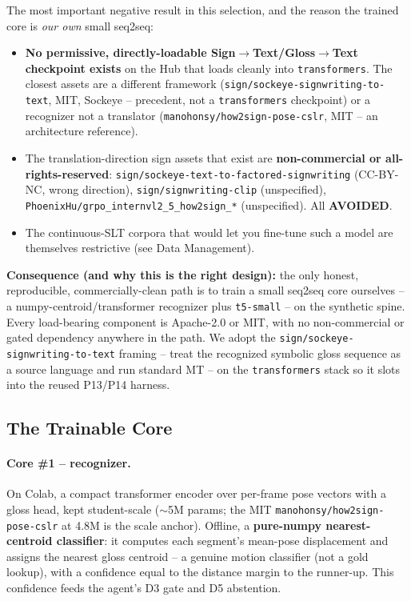 \documentclass[12pt,a4paper]{article}
\begin{document}
The most important negative result in this selection, and the reason the trained core is \emph{our own} small seq2seq:
\begin{itemize}\setlength\itemsep{0.15em}
  \item \textbf{No permissive, directly-loadable Sign$\rightarrow$Text/Gloss$\rightarrow$Text checkpoint exists} on the Hub that loads cleanly into \texttt{transformers}. The closest assets are a different framework (\texttt{sign/sockeye-signwriting-to-text}, MIT, Sockeye -- precedent, not a \texttt{transformers} checkpoint) or a recognizer not a translator (\texttt{manohonsy/how2sign-pose-cslr}, MIT -- an architecture reference).
  \item The translation-direction sign assets that exist are \textbf{non-commercial or all-rights-reserved}: \texttt{sign/sockeye-text-to-factored-signwriting} (CC-BY-NC, wrong direction), \texttt{sign/signwriting-clip} (unspecified), \texttt{PhoenixHu/grpo\_internvl2\_5\_how2sign\_*} (unspecified). All \textbf{AVOIDED}.
  \item The continuous-SLT corpora that would let you fine-tune such a model are themselves restrictive (see Data Management).
\end{itemize}
\textbf{Consequence (and why this is the right design):} the only honest, reproducible, commercially-clean path is to train a small seq2seq core ourselves -- a numpy-centroid/transformer recognizer plus \texttt{t5-small} -- on the synthetic spine. Every load-bearing component is Apache-2.0 or MIT, with no non-commercial or gated dependency anywhere in the path. We adopt the \texttt{sign/sockeye-signwriting-to-text} framing -- treat the recognized symbolic gloss sequence as a source language and run standard MT -- on the \texttt{transformers} stack so it slots into the reused P13/P14 harness.

\subsection{The Trainable Core}

\paragraph{Core \#1 -- recognizer.} On Colab, a compact transformer encoder over per-frame pose vectors with a gloss head, kept student-scale ($\sim$5M params; the MIT \texttt{manohonsy/how2sign-pose-cslr} at 4.8M is the scale anchor). Offline, a \textbf{pure-numpy nearest-centroid classifier}: it computes each segment's mean-pose displacement and assigns the nearest gloss centroid -- a genuine motion classifier (not a gold lookup), with a confidence equal to the distance margin to the runner-up. This confidence feeds the agent's D3 gate and D5 abstention.
\end{document}

